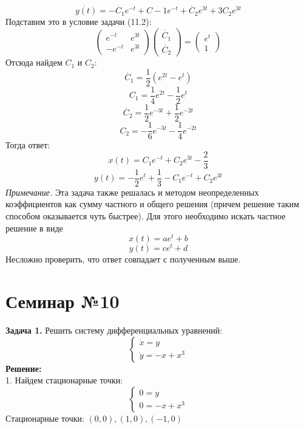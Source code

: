 \documentclass[10pt]{report}
\begin{document}
\[\dot{y(t)}=-\dot{C_1}e^{-t}+C-1e^{-t}+\dot{C_2}e^{3t}+3C_2e^{3t}\]
Подставим это в условие задачи (11.2):
\[\left(
\begin{array}{cc}
e^{-t} & e^{3t}\\
-e^{-t} & e^{3t}
\end{array}\right)\left(
\begin{array}{c}
\dot{C_1}\\
\dot{C_2}
\end{array}\right)=\left(
\begin{array}{c}
e^{t}\\ 
1
\end{array}\right)
\]
Отсюда найдем $C_1$ и $C_2$:
\[\dot{C_1}=\frac 1 2 (e^{2t}-e^t)\]
\[C_1=\frac1 4e^{2t}-\frac 1 2e^t\]
\[\dot{C_2}=\frac 1 2e^{-3t}+\frac 1 2e^{-2t}\]
\[C_2=-\frac 1 6e^{-3t}-\frac 1 4e^{-2t}\]
Тогда ответ:
\[x(t)=C_1e^{-t}+C_2e^{3t}-\frac 2 3\]
\[y(t)=-\frac 1 2 e^t+ \frac 1 3 - C_1e^{-t}+C_2e^{3t}\]
\textit{Примечание.} Эта задача также решалась и методом неопределенных коэффициентов как сумму частного и общего решения (причем решение таким способом оказывается чуть быстрее). Для этого необходимо искать частное  решение в виде
\[x(t)=ae^t+b\]
\[y(t)=ce^t+d\]
Несложно проверить, что ответ совпадает с полученным выше.

\chapter[{Семинар №10}]{Семинар №10}
\thispagestyle{empty}

\textbf{Задача 1.} Решить систему дифференциальных уравнений: 
\begin{equation}
\left\{
\begin{array}{lr}
\dot{x}=y\\
\dot{y}=-x+x^3
\end{array}
\right.
\end{equation}
\textbf{Решение:}\\

1. Найдем стационарные точки:\[
\left\{
\begin{array}{lr}
0=y\\
0=-x+x^3
\end{array}
\right.\]
Стационарные точки: $(0, 0), (1, 0), (-1, 0)$
\end{document}
